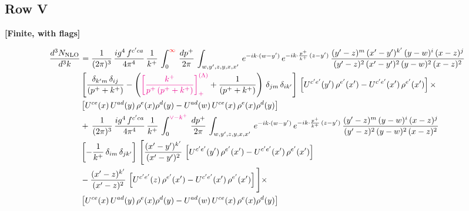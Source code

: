 \documentclass[9pt]{article}
\numberwithin{equation}{section}
\begin{document}
\subsection{Row V}
\par\smallskip\noindent\textbf{[Finite, with flags]}\par\nobreak
\begin{align}
    \frac{d^{3}N_{\rm NLO}}{d^{3}k} & =  \frac{1}{(2\pi)^{3}}\, \frac{ig^{4}\,f^{c'ca}}{4\pi^{4}}\, \frac{1}{k^{+}}\,\int_{0}^{{\color{red}\infty}}\, \frac{dp^{+}}{2\pi}\, \int_{w,y',z,y,x,x'}\, e^{-ik\cdot (w-y')}\, e^{-ik\cdot \frac{p^{+}}{k^{+}}\,(z-y')}\,\frac{(y'-z)^{m}\,(x'-y')^{k'}\,(y-w)^{i}\,(x-z)^{j}}{(y'-z)^{2}\,(x'-y')^{2}\,(y-w)^{2}\,(x-z)^{2}}\notag \\ & \left[\frac{\delta_{k'm}\,\delta_{ij}}{(p^{+}+k^{+})}-\left({\color{magenta}\left[\frac{k^{+}}{p^{+}\,(p^{+}+k^{+})}\right]_{+}^{(\Lambda)}}+\frac{1}{(p^{+}+k^{+})}\right)\,\delta_{jm}\,\delta_{ik'}\right]\, \left[U^{c'e'}(y')\,\rho^{e'}(x')-U^{c'e'}(x')\,\rho^{e'}(x')\right]\times \notag \\ &  \left[U^{ce}(x)\,U^{ad}(y)\,\rho^{e}(x)\rho^{d}(y)-U^{ad}(w)\,U^{ce}(x)\,\rho^{e}(x)\rho^{d}(y)\right] \notag \\
&   +\,\frac{1}{(2\pi)^{3}}\, \frac{ig^{4}\,f^{c'ca}}{4\pi^{4}}\, \frac{1}{k^{+}}\,\int_{0}^{{\color{magenta}\vee-k^{+}}}\, \frac{dp^{+}}{2\pi}\, \int_{w,y',z,y,x,x'}\, e^{-ik\cdot (w-y')}\, e^{-ik\cdot \frac{p^{+}}{k^{+}}\,(z-y')}\,\frac{(y'-z)^{m}\,(y-w)^{i}\,(x-z)^{j}}{(y'-z)^{2}\,(y-w)^{2}\,(x-z)^{2}}\notag \\ &   \left[-\frac{1}{k^{+}}\, \delta_{im}\, \delta_{jk'}\right]\, \Bigg[\frac{(x'-y')^{k'}}{(x'-y')^{2}}\,\left[U^{c'e'}(y')\,\rho^{e'}(x')-U^{c'e'}(x')\,\rho^{e'}(x')\right]\notag \\ & -\frac{(x'-z)^{k'}}{(x'-z)^{2}}\,\left[U^{c'e'}(z)\,\rho^{e'}(x')-U^{c'e'}(x')\,\rho^{e'}(x')\right]\Bigg]\times \notag \\ &    \left[U^{ce}(x)\,U^{ad}(y)\,\rho^{e}(x)\rho^{d}(y)-U^{ad}(w)\,U^{ce}(x)\,\rho^{e}(x)\rho^{d}(y)\right]
\end{align}
\end{document}
